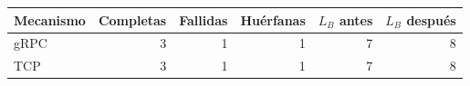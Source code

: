 \begin{tabular}{lrrrrr}
\toprule
Mecanismo & Completas & Fallidas & Huérfanas & $L_B$ antes & $L_B$ después \\
\midrule
gRPC & 3 & 1 & 1 & 7 & 8 \\
TCP & 3 & 1 & 1 & 7 & 8 \\
\bottomrule
\end{tabular}
